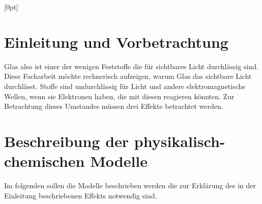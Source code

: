 \documentclass[11pt,a4paper,oneside]{report}
\begin{document}
\titlespacing{\chapter}{0em}{1em}{1.5em}[0pt]
\renewcommand{\contentsname}{Inhaltsverzeichnis}
\renewcommand{\bibname}{Quellen}
\setlength{\parindent}{0em}

\pagestyle{fancy}
\fancyhf{}
\fancyhead[CEO]{\thepage}
\renewcommand{\headrulewidth}{0pt}

\setcounter{page}{2}


\tableofcontents

\clearpage

\chapter{Einleitung und Vorbetrachtung}

Glas also  ist einer der wenigen Feststoffe die für sichtbares Licht durchlässig sind. Diese Facharbeit möchte rechnerisch aufzeigen, warum Glas das sichtbare Licht durchlässt.
Stoffe sind undurchlässig für Licht und andere elektromagnetische Wellen, wenn sie Elektronen haben, die mit diesen reagieren könnten.
Zur Betrachtung dieses Umstandes müssen drei Effekte betrachtet werden\cite{pape99}.

\chapter{Beschreibung der physikalisch-chemischen Modelle}
Im folgenden sollen die Modelle beschrieben werden die zur Erklärung des in der Einleitung beschriebenen Effekts notwendig sind.
\end{document}
